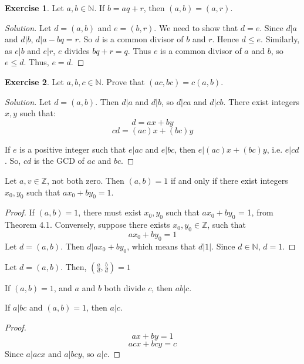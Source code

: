 \documentclass[12pt,letterpaper]{amsbook}
\theoremstyle{definition}
\newtheorem*{exercise}{Exercise}
\newenvironment{solution}
  {\renewcommand\qedsymbol{$\blacksquare$}\begin{proof}[Solution]}
  {\end{proof}}
\newcommand{\N}{\mathbb{N}}
\newcommand{\Z}{\mathbb{Z}}
\begin{document}
\begin{exercise}
  Let $a,b \in \N$. If $b = aq+r$, then $(a,b) = (a,r)$.
\end{exercise}
\begin{solution}
  Let $d = (a,b)$ and $e = (b,r)$. We need to show that $d = e$. Since $d|a$ and $d|b$, $d|a-bq=r$. So $d$ is a common divisor of $b$ and $r$. Hence $d \leq e$. Similarly, as $e|b$ and $e|r$, $e$ divides $bq+r = q$. Thus $e$  is a common divisor of $a$ and $b$, so $e \leq d$. Thus, $e = d$.
\end{solution}

\begin{exercise}
  Let $a,b,c \in \N$. Prove that $(ac,bc) = c(a,b)$.  
\end{exercise}
\begin{solution}
  Let $d = (a,b)$. Then $d|a$ and $d|b$, so $d|ca$ and $d|cb$.  There exist integers $x,y$ such that:
  \[d = ax+by\]
  \[cd = (ac)x + (bc)y\]

  If $e$ is a positive integer such that $e | ac$ and $e|bc$, then $e|(ac)x+(bc)y$, i.e. $e|cd$. So, $cd$ is the GCD of $ac$ and $bc$.
\end{solution}

\begin{theorem}
  Let $a,v \in \Z$, not both zero. Then $(a,b) = 1$ if and only if there exist integers $x_0,y_0$ such that $ax_0 + by_0 = 1$.  
\end{theorem}
\begin{proof}
  If $(a,b) = 1$, there must exist $x_0,y_0$ such that $ax_0+by_0$ = 1, from Theorem 4.1.
  Conversely, suppose there exists $x_0,y_0 \in \Z$, such that 
  \[ax_0 + by_0 = 1\]
  Let $d = (a,b)$. Then $d|ax_0+by_0$, which means that $d|1|$. Since $d \in \N$, $d=1$.
\end{proof}

\begin{corollary}
  Let $d = (a,b)$. Then, $(\frac{a}{d}, \frac{b}{d}) = 1$
\end{corollary}

\begin{corollary}
  If $(a,b) = 1$, and $a$ and $b$ both divide $c$, then $ab|c$.  
\end{corollary}

\begin{theorem}
  If $a|bc$ and $(a,b) = 1$, then $a|c$.  
\end{theorem}
\begin{proof}
  \[ax+by = 1\]
  \[acx+bcy=c\]
  Since $a|acx$ and $a|bcy$, so $a|c$.
\end{proof}
\end{document}
